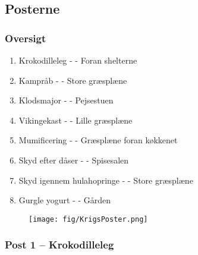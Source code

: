 \subsection{Posterne}

\subsubsection*{Oversigt}
\begin{enumerate}
  \item Krokodilleleg - \Stive - Foran shelterne
  \item Kampråb - \Mighty - Store græsplæne
  \item Klodsmajor - \Buddha - Pejsestuen
  \item Vikingekast - \Karla - Lille græsplæne
  \item Mumificering - \Farav - Græsplæne foran køkkenet
  \item Skyd efter dåser - \Clint - Spisesalen
  \item Skyd igennem hulahopringe - \Randildo - Store græsplæne
  \item Gurgle yogurt - \Hemorides - Gården
\end{enumerate}

\begin{figure}[H]
\centering
\texttt{[image: fig/KrigsPoster.png]}
\end{figure}

\pagebreak

\subsubsection*{\textbf{Post 1 –  Krokodilleleg}}
